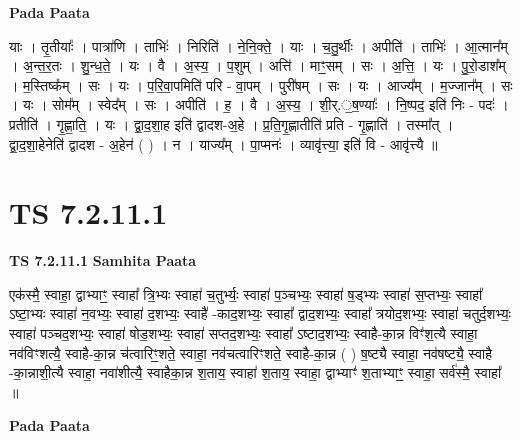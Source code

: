 \documentclass[17pt]{extarticle}
\begin{document}
\textbf{Pada Paata} \newline

याः । तृ॒तीयाः᳚ । पात्रा॑णि । ताभिः॑ । निरिति॑ । ने॒नि॒क्ते॒ । याः । च॒तु॒र्थीः । अपीति॑ । ताभिः॑ । आ॒त्मान᳚म् । अ॒न्त॒र॒तः । शु॒न्ध॒ते॒ । यः । वै । अ॒स्य॒ । प॒शुम् । अत्ति॑ । माꣳ॒॒सम् । सः । अ॒त्ति॒ । यः । पु॒रो॒डाश᳚म् । म॒स्तिष्क᳚म् । सः । यः । प॒रि॒वा॒पमिति॑ परि - वा॒पम् । पुरी॑षम् । सः । यः । आज्य᳚म् । म॒ज्जान᳚म् । सः । यः । सोम᳚म् । स्वेद᳚म् । सः । अपीति॑ । ह॒ । वै । अ॒स्य॒ । शी॒र्.॒ष॒ण्याः᳚ । नि॒ष्पद॒ इति॑ निः - पदः॑ । प्रतीति॑ । गृ॒ह्णा॒ति॒ । यः । द्वा॒द॒शा॒ह इति॑ द्वादश-अ॒हे । प्र॒ति॒गृ॒ह्णातीति॑ प्रति - गृ॒ह्णाति॑ । तस्मा᳚त् । द्वा॒द॒शा॒हेनेति॑ द्वादश - अ॒हेन॑ ( ) । न । याज्य᳚म् । पा॒प्मनः॑ । व्यावृ॑त्त्या॒ इति॑ वि - आवृ॑त्त्यै ॥  \newline




\section*{ TS 7.2.11.1 }

\textbf{TS 7.2.11.1 } \newline
\textbf{Samhita Paata} \newline

एक॑स्मै॒ स्वाहा॒ द्वाभ्याꣳ॒॒ स्वाहा᳚ त्रि॒भ्यः स्वाहा॑ च॒तुर्भ्यः॒ स्वाहा॑ प॒ञ्चभ्यः॒ स्वाहा॑ ष॒ड्भ्यः स्वाहा॑ स॒प्तभ्यः॒ स्वाहा᳚ ऽष्टा॒भ्यः स्वाहा॑ न॒वभ्यः॒ स्वाहा॑ द॒शभ्यः॒ स्वाहै॑ -काद॒शभ्यः॒ स्वाहा᳚ द्वाद॒शभ्यः॒ स्वाहा᳚ त्रयोद॒शभ्यः॒ स्वाहा॑ चतुर्द॒शभ्यः॒ स्वाहा॑ पञ्चद॒शभ्यः॒ स्वाहा॑ षोड॒शभ्यः॒ स्वाहा॑ सप्तद॒शभ्यः॒ स्वाहा᳚ ऽष्टाद॒शभ्यः॒ स्वाहै-का॒न्न विꣳ॑श॒त्यै स्वाहा॒ नव॑विꣳशत्यै॒ स्वाहै-का॒न्न च॑त्वारिꣳ॒॒शते॒ स्वाहा॒ नव॑चत्वारिꣳशते॒ स्वाहै-का॒न्न ( ) ष॒ष्ट्यै स्वाहा॒ नव॑षष्ट्यै॒ स्वाहै -का॒न्नाशी॒त्यै स्वाहा॒ नवा॑शीत्यै॒ स्वाहैका॒न्न श॒ताय॒ स्वाहा॑ श॒ताय॒ स्वाहा॒ द्वाभ्याꣳ॑ श॒ताभ्याꣳ॒॒ स्वाहा॒ सर्व॑स्मै॒ स्वाहा᳚ ॥ \newline

\textbf{Pada Paata} \newline
\end{document}
